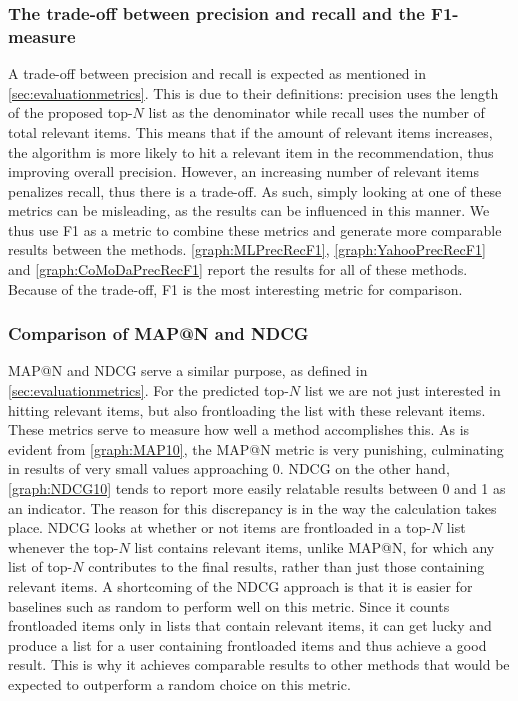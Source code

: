 \subsubsection{The trade-off between precision and recall and the F1-measure}\label{subsub:precrectradeoff}
A trade-off between precision and recall is expected as mentioned in \autoref{sec:evaluationmetrics}.
This is due to their definitions: precision uses the length of the proposed top-$N$ list as the denominator while recall uses the number of total relevant items.
This means that if the amount of relevant items increases, the algorithm is more likely to hit a relevant item in the recommendation, thus improving overall precision.
However, an increasing number of relevant items penalizes recall, thus there is a trade-off.
As such, simply looking at one of these metrics can be misleading, as the results can be influenced in this manner.
We thus use F1 as a metric to combine these metrics and generate more comparable results between the methods.
\autoref{graph:MLPrecRecF1}, \autoref{graph:YahooPrecRecF1} and \autoref{graph:CoMoDaPrecRecF1} report the results for all of these methods.
Because of the trade-off, F1 is the most interesting metric for comparison.

\subsubsection{Comparison of MAP@N and NDCG}
MAP@N and NDCG serve a similar purpose, as defined in \autoref{sec:evaluationmetrics}.
For the predicted top-$N$ list we are not just interested in hitting relevant items, but also frontloading the list with these relevant items.
These metrics serve to measure how well a method accomplishes this.
As is evident from \autoref{graph:MAP10}, the MAP@N metric is very punishing, culminating in results of very small values approaching 0.
NDCG on the other hand, \autoref{graph:NDCG10} tends to report more easily relatable results between 0 and 1 as an indicator.
The reason for this discrepancy is in the way the calculation takes place.
NDCG looks at whether or not items are frontloaded in a top-$N$ list whenever the top-$N$ list contains relevant items, unlike MAP@N, for which any list of top-$N$ contributes to the final results, rather than just those containing relevant items.
A shortcoming of the NDCG approach is that it is easier for baselines such as random to perform well on this metric.
Since it counts frontloaded items only in lists that contain relevant items, it can get lucky and produce a list for a user containing frontloaded items and thus achieve a good result.
This is why it achieves comparable results to other methods that would be expected to outperform a random choice on this metric.

